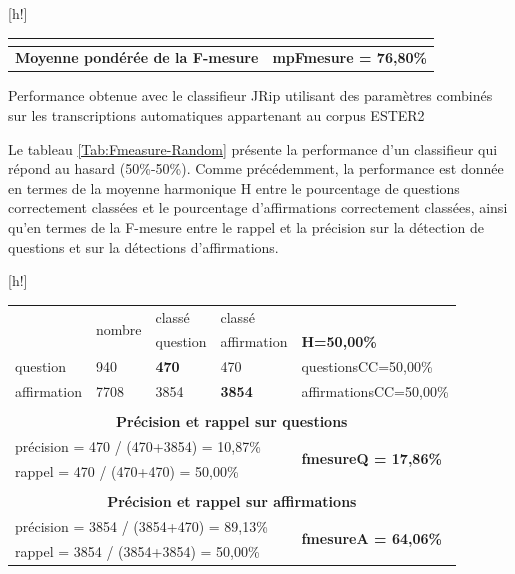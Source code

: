 \documentclass{style/these}
\makeatletter
\renewcommand\familydefault{ptm}
\newenvironment{aTable}%
  {%
   \renewcommand{\familydefault}{lmtt}\selectfont
  \@float{table}}
  {\end@float}
\makeatother
\begin{document}
\begin{part}
\begin{aTable}[h!]
\begin{tabular}{|p{2.4cm}|p{1.4cm}|p{2.1cm}|p{2.3cm}|p{4cm}|}
\multicolumn{5}{c}{}			   													\\ \hline
\multicolumn{4}{|c|}{\textbf{Moyenne pondérée de la F-mesure}}			& \textbf{\color{purple}mpFmesure = 76,80\%}			\\ \hline
\end{tabular}
\caption{Performance obtenue avec le classifieur JRip utilisant des paramètres combinés sur les transcriptions automatiques appartenant au corpus ESTER2} 
\label{Tab:Fmeasure-max}
\end{aTable}


Le tableau \ref{Tab:Fmeasure-Random} présente la performance d'un classifieur qui répond au hasard (50\%-50\%). 
Comme précédemment, la performance est donnée en termes de la moyenne harmonique H entre le pourcentage de questions correctement classées et le pourcentage d'affirmations correctement classées, ainsi qu'en termes de la F-mesure entre le rappel et la précision sur la détection de questions et sur la détections d'affirmations.

\newpage


\begin{aTable}[h!]
\hspace*{-1ex}
\begin{tabular}{|p{2.4cm}|p{1.4cm}|p{2.1cm}|p{2.3cm}|p{4cm}|}
\cline{2-4}
\multicolumn{1}{c|}{}	& \multirow{2}{*}{nombre} 	& classé 		& classé 		& \multicolumn{1}{c}{}					\\
\multicolumn{1}{c|}{}	&  				& question		& affirmation 		& \multicolumn{1}{l}{\textbf{\color{purple}H=50,00\%}} 	\\ \cline{1-4}
question   		&  940 				& \textbf{470} 		& 470    		& \multicolumn{1}{l}{questionsCC=50,00\%} 		\\ \cline{1-4}
affirmation  		& 7708 				& 3854 			& \textbf{3854}  	& \multicolumn{1}{l}{affirmationsCC=50,00\%}   		\\ \cline{1-4}

\multicolumn{5}{c}{}			   													\\ \hline
\multicolumn{5}{|c|}{\textbf{Précision et rappel sur questions}}			   							\\ \hline
\multicolumn{4}{|l|}{\footnotesize précision = 470 / (470+3854) = 10,87\%} 	& \multirow{2}{*}{\textbf{\color{purple}fmesureQ = 17,86\%}}	\\
\multicolumn{4}{|l|}{\footnotesize rappel = 470 / (470+470) = 50,00\%} 		& 								\\ \hline

\multicolumn{5}{c}{}			   													\\ \hline
\multicolumn{5}{|c|}{\textbf{Précision et rappel sur affirmations}}		 								\\ \hline
\multicolumn{4}{|l|}{\footnotesize précision = 3854 / (3854+470) = 89,13\%} 	& \multirow{2}{*}{\textbf{\color{purple}fmesureA = 64,06\%}}	\\
\multicolumn{4}{|l|}{\footnotesize rappel = 3854 / (3854+3854) = 50,00\%} 	& 								\\ \hline


\end{tabular}
\end{aTable}
\end{part}
\end{document}

